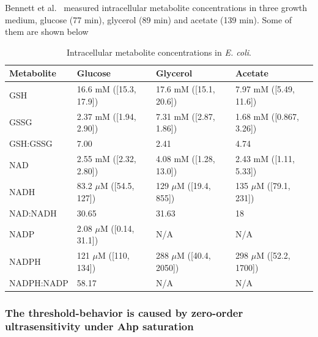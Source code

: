 \documentclass[10pt]{article}
\begin{document}
Bennett et al.~\cite{bennett2009absolute} measured intracellular metabolite concentrations in three growth medium, glucose (77 min), glycerol (89 min) and acetate (139 min). Some of them are shown below
\begin{table}[H]
  \begin{center}
    \begin{tabular}{|l|l|l|l|} %
    \hline
     \textbf{Metabolite} & \textbf{Glucose} & \textbf{Glycerol} & \textbf{Acetate}\\
      \hline
      GSH & 16.6 mM ([15.3, 17.9]) & 17.6 mM ([15.1, 20.6]) & 7.97 mM ([5.49, 11.6]) \\ \hline
      GSSG & 2.37 mM ([1.94, 2.90]) & 7.31 mM ([2.87, 1.86]) & 1.68 mM ([0.867, 3.26]) \\ \hline
      GSH:GSSG & 7.00 & 2.41 & 4.74 \\ \hline
      NAD & 2.55 mM ([2.32, 2.80]) & 4.08 mM ([1.28, 13.0]) & 2.43 mM ([1.11, 5.33]) \\ \hline
      NADH & 83.2 $\mu$M ([54.5, 127]) & 129 $\mu$M ([19.4, 855]) & 135 $\mu$M ([79.1, 231]) \\ \hline
      NAD:NADH & 30.65 & 31.63 & 18 \\ \hline
      NADP & 2.08 $\mu$M ([0.14, 31.1]) & N/A & N/A \\ \hline
      NADPH & 121 $\mu$M ([110, 134]) & 288 $\mu$M ([40.4, 2050]) & 298 $\mu$M ([52.2, 1700]) \\ \hline
      NADPH:NADP & 58.17 & N/A  & N/A \\ \hline
    \end{tabular}
        \caption{Intracellular metabolite concentrations in \textit{E. coli}.}
    \label{tab:metconc}
  \end{center}
\end{table}
 


\subsubsection{The threshold-behavior is caused by zero-order ultrasensitivity under Ahp saturation}
\end{document}
